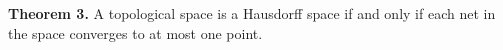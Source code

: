 \textbf{Theorem 3.} A topological space is a Hausdorff space if and only if each net in the space converges to at most one point.
